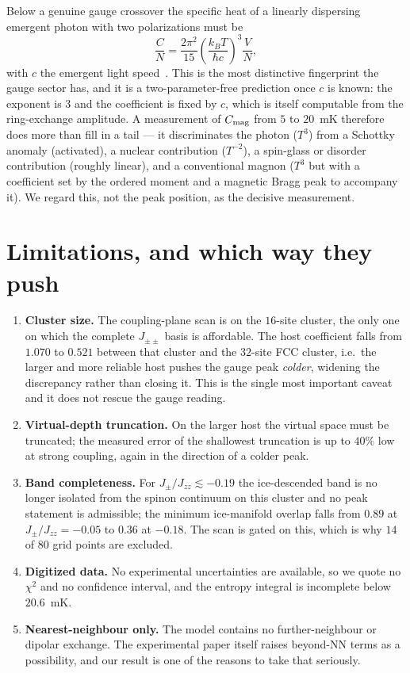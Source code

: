 \documentclass[aps,prb,preprint,amsmath,amssymb,superscriptaddress,
longbibliography,floatfix]{revtex4-2}
\newcommand{\Jzz}{J_{zz}}
\newcommand{\Jpm}{J_{\pm}}
\newcommand{\Jpmpm}{J_{\pm\pm}}
\begin{document}
Below a genuine gauge crossover the specific heat of a linearly dispersing
emergent photon with two polarizations must be
\begin{equation}
 \frac{C}{N}=\frac{2\pi^2}{15}\left(\frac{k_BT}{\hbar c}\right)^3
 \frac{V}{N} ,
 \label{eq:T3}
\end{equation}
with $c$ the emergent light speed~\cite{Benton2012}.  This is the most
distinctive fingerprint the gauge sector has, and it is a two-parameter-free
prediction once $c$ is known: the exponent is $3$ and the coefficient is fixed
by $c$, which is itself computable from the ring-exchange amplitude.  A
measurement of $C_{\rm mag}$ from $5$ to $20$~mK therefore does more than fill
in a tail --- it discriminates the photon ($T^3$) from a Schottky anomaly
(activated), a nuclear contribution ($T^{-2}$), a spin-glass or disorder
contribution (roughly linear), and a conventional magnon ($T^3$ but with a
coefficient set by the ordered moment and a magnetic Bragg peak to accompany
it).  We regard this, not the peak position, as the decisive measurement.

\section{Limitations, and which way they push}
\label{sec:caveat}

\begin{enumerate}
\item \textbf{Cluster size.}  The coupling-plane scan is on the $16$-site
cluster, the only one on which the complete $\Jpmpm$ basis is affordable.  The
host coefficient falls from $1.070$ to $0.521$ between that cluster and the
$32$-site FCC cluster, i.e.\ the larger and more reliable host pushes the gauge
peak \emph{colder}, widening the discrepancy rather than closing it.  This is
the single most important caveat and it does not rescue the gauge reading.
\item \textbf{Virtual-depth truncation.}  On the larger host the virtual space
must be truncated; the measured error of the shallowest truncation is up to
$40\%$ low at strong coupling, again in the direction of a colder peak.
\item \textbf{Band completeness.}  For $\Jpm/\Jzz\lesssim-0.19$ the ice-descended
band is no longer isolated from the spinon continuum on this cluster and no peak
statement is admissible; the minimum ice-manifold overlap falls from $0.89$ at
$\Jpm/\Jzz=-0.05$ to $0.36$ at $-0.18$.  The scan is gated on this, which is why
$14$ of $80$ grid points are excluded.
\item \textbf{Digitized data.}  No experimental uncertainties are available, so
we quote no $\chi^2$ and no confidence interval, and the entropy integral is
incomplete below $20.6$~mK.
\item \textbf{Nearest-neighbour only.}  The model contains no further-neighbour
or dipolar exchange.  The experimental paper itself raises beyond-NN terms as a
possibility, and our result is one of the reasons to take that seriously.
\end{enumerate}
\end{document}
